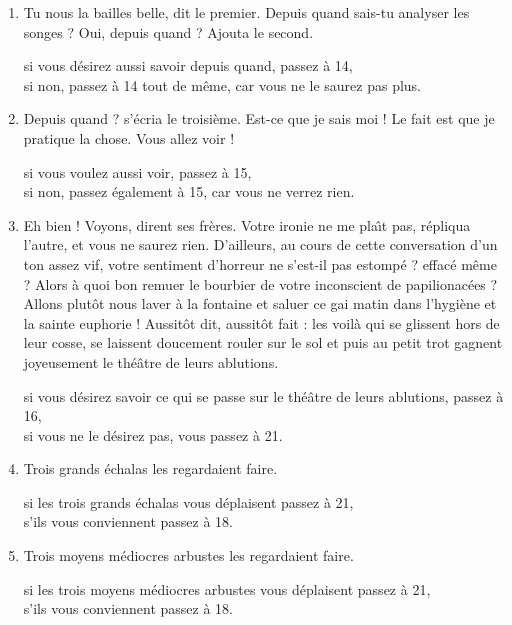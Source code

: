 {\begin{multicols}{2}
\begin{enumerate}
si vous d\'esirez conna\^\i tre tout de suite l'interpr\'etation de ce songe, passez \`a
15,\\
si vous souhaitez au contraire conna\^\i tre les r\'eactions des deux autres, passez
\`a 13.

\item Tu nous la bailles belle, dit le premier. Depuis quand sais-tu analyser
les songes ? Oui, depuis quand ? Ajouta le second.

si vous d\'esirez aussi savoir depuis quand, passez \`a 14,\\
si non, passez \`a 14 tout de m\^eme, car vous ne le saurez pas plus.

\item Depuis quand ? s'\'ecria le troisi\`eme. Est-ce que je sais moi ! Le fait
est que je pratique la chose. Vous allez voir !

si vous voulez aussi voir, passez \`a 15,\\
si non, passez \'egalement \`a 15, car vous ne verrez rien.

\item Eh bien ! Voyons, dirent ses fr\`eres. Votre ironie ne me pla\^\i t pas,
r\'epliqua l'autre, et vous ne saurez rien. D'ailleurs, au cours de cette
conversation d'un ton assez vif, votre sentiment d'horreur ne s'est-il pas
estomp\'e ? effac\'e m\^eme ? Alors \`a quoi bon remuer le bourbier de votre
inconscient de papilionac\'ees ? Allons plut\^ot nous laver \`a la fontaine et
saluer ce gai matin dans l'hygi\`ene et la sainte euphorie ! Aussit\^ot dit,
aussit\^ot fait : les voil\`a qui se glissent hors de leur cosse, se laissent
doucement rouler sur le sol et puis au petit trot gagnent joyeusement le
th\'e\^atre de leurs ablutions.

si vous d\'esirez savoir ce qui se passe sur le th\'e\^atre de leurs ablutions,
passez \`a 16,\\
si vous ne le d\'esirez pas, vous passez \`a 21.

\item Trois grands \'echalas les regardaient faire. 

si les trois grands \'echalas vous d\'eplaisent passez \`a 21,\\
s'ils vous conviennent passez \`a 18.

\item Trois moyens m\'ediocres arbustes les regardaient faire.

si les trois moyens m\'ediocres arbustes vous d\'eplaisent passez \`a 21,\\
s'ils vous conviennent passez \`a 18.


\end{enumerate}
\end{multicols}}
